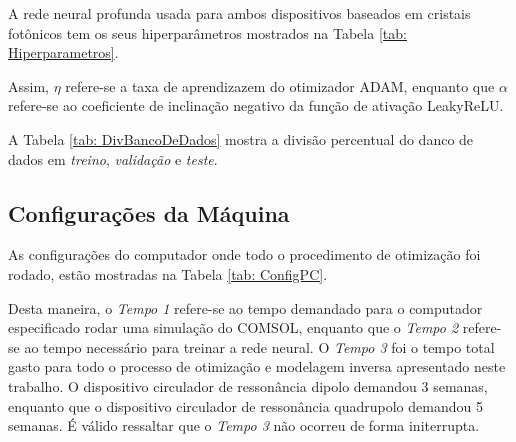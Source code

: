 A rede neural profunda usada para ambos dispositivos baseados em cristais fotônicos tem os seus hiperparâmetros mostrados na Tabela \ref{tab: Hiperparametros}.



Assim, $\eta$ refere-se a taxa de aprendizazem do otimizador ADAM, enquanto que $\alpha$ refere-se ao coeficiente de inclinação negativo da função de ativação LeakyReLU.

A Tabela \ref{tab: DivBancoDeDados} mostra a divisão percentual do danco de dados em \textit{treino}, \textit{validação} e \textit{teste}.




\subsection{Configurações da Máquina}

As configurações do computador onde todo o procedimento de otimização foi rodado, estão mostradas na Tabela \ref{tab: ConfigPC}.



Desta maneira, o \textit{Tempo 1} refere-se ao tempo demandado para o computador especificado rodar uma simulação do COMSOL, enquanto que o \textit{Tempo 2} refere-se ao tempo necessário para treinar a rede neural. O \textit{Tempo 3} foi o tempo total gasto para todo o processo de otimização e modelagem inversa apresentado neste trabalho. O dispositivo circulador de ressonância dipolo demandou 3 semanas, enquanto que o dispositivo circulador de ressonância quadrupolo demandou 5 semanas. É válido ressaltar que o \textit{Tempo 3} não ocorreu de forma initerrupta.